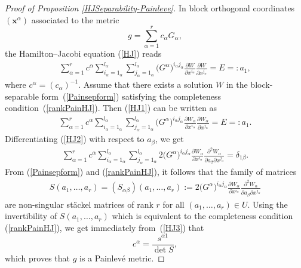 \documentclass[11pt]{article}
\numberwithin{equation}{section}
\newcommand{\ialpha}{i_{\alpha}}
\newcommand{\jalpha}{j_{\alpha}}
\newcommand{\lalpha}{l_{\alpha}}
\begin{document}
\begin{proof}[Proof of Proposition \ref{HJSeparability-Painleve}]

In block orthogonal coordinates $(\textbf{x}^\alpha)$ associated to the metric
\[
 g = \sum_{\alpha = 1}^r c_\alpha G_\alpha,
\]
the Hamilton--Jacobi equation (\ref{HJ}) reads
\begin{gather} \label{HJ1}
 \sum_{\alpha =1}^{r} c^\alpha \sum_{\ialpha =1_{\alpha}}^{\lalpha}\sum_{\jalpha =1_{\alpha}}^{\lalpha} \big(G^{\alpha}\big)^{\ialpha \jalpha}\frac{\partial W}{\partial x^{\ialpha} }\frac{\partial W}{\partial x^{\jalpha}}=E=:a_{1},
\end{gather}
where $c^\alpha = (c_\alpha)^{-1}$. Assume that there exists a solution $W$ in the block-separable form~(\ref{Painsepform}) satisfying the completeness condition~(\ref{rankPainHJ}). Then (\ref{HJ1}) can be written as
\begin{gather} \label{HJ2}
 \sum_{\alpha =1}^{r} c^\alpha \sum_{\ialpha =1_{\alpha}}^{\lalpha}\sum_{\jalpha =1_{\alpha}}^{\lalpha} \big(G^{\alpha}\big)^{\ialpha \jalpha}\frac{\partial W_\alpha}{\partial x^{\ialpha} }\frac{\partial W_\alpha}{\partial x^{\jalpha}}=E=:a_{1}.
\end{gather}
Differentiating (\ref{HJ2}) with respect to $a_\beta$, we get
\begin{gather} \label{HJ3}
 \sum_{\alpha =1}^{r} c^\alpha \sum_{\ialpha =1_{\alpha}}^{\lalpha}\sum_{\jalpha =1_{\alpha}}^{\lalpha} 2 \big(G^{\alpha}\big)^{\ialpha \jalpha}\frac{\partial W_\alpha}{\partial x^{\ialpha} } \frac{\partial^2 W_\alpha}{\partial a_\beta \partial x^{\jalpha}} = \delta_{1\beta} .
\end{gather}
From (\ref{Painsepform}) and (\ref{rankPainHJ}), it follows that the family of matrices
\begin{gather*} %
 S(a_1,\dots,a_r) = (S_{\alpha \beta})(a_1,\dots,a_r) := 2 \big(G^{\alpha}\big)^{\ialpha \jalpha}\frac{\partial W_\alpha}{\partial x^{\ialpha} } \frac{\partial^2 W_\alpha}{\partial a_\beta \partial x^{\jalpha}}
\end{gather*}
are non-singular st\"ackel matrices of rank $r$ for all $(a_1,\dots,a_r) \in U$. Using the invertibility of $S(a_1,\dots,a_r)$ which is equivalent to the completeness condition (\ref{rankPainHJ}), we get immediately from~(\ref{HJ3}) that
\[
 c^\alpha = \frac{s^{\alpha 1}}{\det S},
\]
which proves that $g$ is a Painlev\'e metric.


\end{proof}
\end{document}

